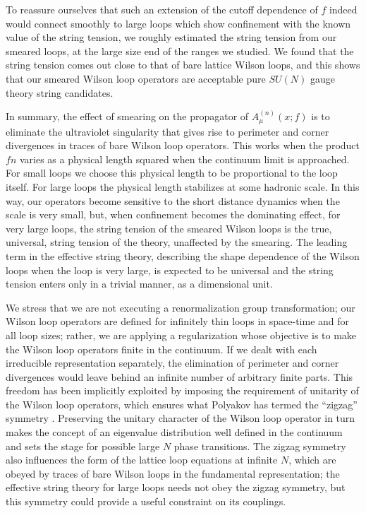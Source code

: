 To reassure ourselves that such an extension of the cutoff
dependence of $f$ indeed would connect smoothly to large loops
which show confinement with the known value of the string tension,
we roughly estimated the string tension from our smeared loops,
at the large size end of the ranges we studied. We found that the
string tension comes out close to that of bare lattice Wilson
loops, and this shows that our smeared Wilson loop operators are
acceptable pure $SU(N)$ gauge theory string candidates.


In summary, the effect of smearing on the propagator of
$A^{(n)}_\mu (x;f)$ is to eliminate the ultraviolet singularity
that gives rise to perimeter and corner divergences in traces of
bare Wilson loop operators. This works when the product $fn$
varies as a physical length squared when the continuum limit is
approached. For small loops we choose this physical length to be
proportional to the loop itself. For large loops the physical
length stabilizes at some hadronic scale. In this way, our
operators become sensitive to the short distance dynamics when the
scale is very small, but, when confinement becomes the dominating
effect, for very large loops, the string tension of the smeared
Wilson loops is the true, universal, string tension of the theory,
unaffected by the smearing. The leading term in the effective
string theory, describing the shape dependence of the Wilson loops
when the loop is very large, is expected to be universal and the
string tension enters only in a trivial manner, as a dimensional
unit.

We stress that we are not executing a renormalization group
transformation; our Wilson loop operators are defined for
infinitely thin loops in space-time and for all loop sizes;
rather, we are applying a regularization whose objective is to
make the Wilson loop operators finite in the continuum. If we
dealt with each irreducible representation separately, the
elimination of perimeter and corner divergences would leave behind
an infinite number of arbitrary finite parts. This freedom has
been implicitly exploited by imposing the requirement of unitarity
of the Wilson loop operators, which ensures what Polyakov has
termed the ``zigzag'' symmetry \cite{poly3}. Preserving the
unitary character of the Wilson loop operator in turn makes the
concept of an eigenvalue distribution well defined in the
continuum and sets the stage for possible large $N$ phase
transitions. The zigzag symmetry also influences the form of the
lattice loop equations at infinite $N$, which are obeyed by traces
of bare Wilson loops in the fundamental representation; the
effective string theory for large loops needs not obey the zigzag
symmetry, but this symmetry could provide a useful constraint on
its couplings.
